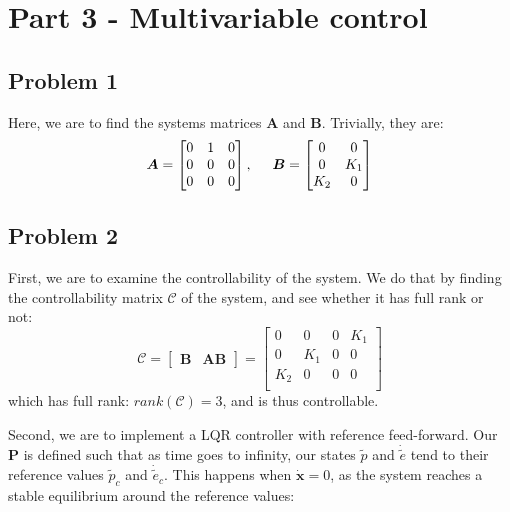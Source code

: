 \section{Part 3 - Multivariable control}
\subsection{Problem 1}
Here, we are to find the systems matrices $\boldsymbol{A}$ and $\boldsymbol{B}$. Trivially, they are:
\begin{equation}
  \boldsymbol{A} = \begin{bmatrix}
    0 & 1 & 0 \\
    0 & 0 & 0 \\
    0 & 0 & 0 \\
  \end{bmatrix}, \hspace{0.5cm}
  \boldsymbol{B} = \begin{bmatrix}
    0 & 0 \\
    0 & K_1 \\
    K_2 & 0 \\
  \end{bmatrix}
\end{equation}

\subsection{Problem 2}
First, we are to examine the controllability of the system. We do that by finding the controllability matrix $\boldsymbol{\mathcal{C}}$ of the system, and see whether it has full rank or not:
\begin{equation}
  \boldsymbol{\mathcal{C}} = \begin{bmatrix}
    \boldsymbol{B} & \boldsymbol{AB}
  \end{bmatrix}
  =
  \begin{bmatrix}
    0 & 0 & 0 & K_1 \\
    0 & K_1 & 0 & 0 \\
    K_2 & 0 & 0 & 0 \\
  \end{bmatrix}
\end{equation}
which has full rank: $rank(\boldsymbol{\mathcal{C}}) = 3$, and is thus
controllable.

Second, we are to implement a LQR controller with reference feed-forward. Our $\boldsymbol{P}$ is defined such that as time goes to infinity, our states $\tilde{p}$ and $\dot{\tilde{e}}$ tend to their reference values $\tilde{p}_c$ and $\dot{\tilde{e}}_c$. This happens when
$\dot{\boldsymbol{x}} = 0$, as the system reaches a stable equilibrium
around the reference values:

